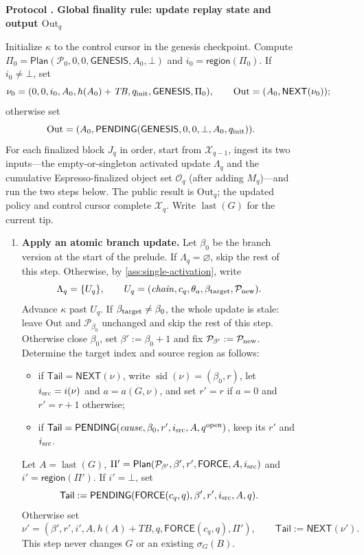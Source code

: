 \documentclass[11pt,a4paper]{article}
\newcommand{\TB}{\mathit{TB}}
\newcommand{\tagg}[1]{\ensuremath{\mathsf{#1}}}
\newcounter{protocol}
\newenvironment{protocol}[3][htbp]{\begin{figure}[#1]\refstepcounter{protocol}\label{#2}
\begin{mdframed}[linewidth=.6pt,skipabove=0pt,skipbelow=0pt,
innertopmargin=7pt,innerbottommargin=7pt]\small
\textbf{Protocol \theprotocol. #3}\par\smallskip}{\end{mdframed}\end{figure}}
\begin{document}
\begin{protocol}[H]{alg:global-rule}{Global finality rule: update replay state and output $\mathrm{Out}_q$}
Initialize $\kappa$ to the control cursor in the genesis checkpoint. Compute
$\Pi_0=\tagg{Plan}(\mathcal P_0,0,0,\tagg{GENESIS},A_0,\bot)$ and
$i_0=\tagg{region}(\Pi_0)$.  If $i_0\ne\bot$, set
\[
 \nu_0=(0,0,i_0,A_0,h(A_0)+\TB,q_{\rm init},\tagg{GENESIS},\Pi_0),
 \qquad \mathrm{Out}=(A_0,\tagg{NEXT}(\nu_0));
\]
otherwise set
\[
 \mathrm{Out}=(A_0,
 \tagg{PENDING}(\tagg{GENESIS},0,0,\bot,A_0,q_{\rm init})).
\]
For each finalized block $J_q$ in order, start from $\mathcal X_{q-1}$,
ingest its two inputs---the empty-or-singleton activated update
$\Lambda_q$ and the cumulative
Espresso-finalized object set $\mathcal O_q$ (after adding $M_q$)---and
run the two steps below. The public result is $\mathrm{Out}_q$; the
updated policy and control cursor complete $\mathcal X_q$. Write
$\operatorname{last}(G)$ for the current tip.
\begin{enumerate}[label=\textbf{\arabic*)},itemsep=3pt]
\item \textbf{Apply an atomic branch update.}
Let $\beta_0$ be the branch version at the start of the prelude. If
$\Lambda_q=\varnothing$, skip the rest of this step. Otherwise, by
\cref{ass:single-activation}, write
\[
 \Lambda_q=\{U_q\},\qquad
 U_q=(\mathit{chain},c_q,\theta_a,\beta_{\rm target},\mathcal P_{\rm new}).
\]
Advance $\kappa$ past $U_q$. If $\beta_{\rm target}\ne\beta_0$, the
whole update is stale: leave $\mathrm{Out}$ and $\mathcal P_{\beta_0}$
unchanged and skip the rest of this step. Otherwise close $\beta_0$, set
$\beta':=\beta_0+1$ and fix $\mathcal P_{\beta'}:=\mathcal P_{\rm new}$.
Determine the target index and source region as follows:
  \begin{itemize}[itemsep=1pt]
  \item if $\mathsf{Tail}=\tagg{NEXT}(\nu)$, write
  $\operatorname{sid}(\nu)=(\beta_0,r)$, let $i_{\rm src}=i(\nu)$ and
  $a=a(G,\nu)$, and set $r'=r$ if $a=0$ and $r'=r+1$ otherwise;
  \item if $\mathsf{Tail}=\tagg{PENDING}
  (\mathit{cause},\beta_0,r',i_{\rm src},A,q^{\rm open})$, keep its $r'$ and
  $i_{\rm src}$.
  \end{itemize}
Let $A=\operatorname{last}(G)$,
$\Pi'=\tagg{Plan}(\mathcal P_{\beta'},\beta',r',\tagg{FORCE},A,i_{\rm src})$
and $i'=\tagg{region}(\Pi')$.  If $i'=\bot$, set
\[
 \mathsf{Tail}:=\tagg{PENDING}
 (\tagg{FORCE}(c_q,q),\beta',r',i_{\rm src},A,q).
\]
Otherwise set
\[
 \nu'=(\beta',r',i',A,h(A)+\TB,q,
       \tagg{FORCE}(c_q,q),\Pi'),
 \qquad \mathsf{Tail}:=\tagg{NEXT}(\nu').
\]
This step never changes $G$ or an existing $\sigma_G(B)$.


\end{enumerate}
\end{protocol}
\end{document}
